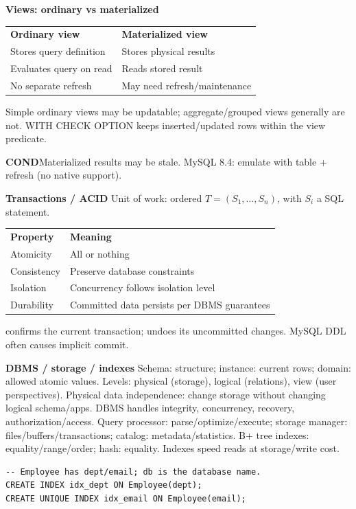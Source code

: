 \documentclass[a4paper]{article}
\newcommand{\sqlfont}{\ttfamily}
\newcommand{\bodyfontsize}{5.55}
\newcommand{\bodyleading}{5.3}
\newcommand{\bodylineskiplimit}{-2pt}
\newcommand{\bodystyle}{%
  \fontsize{\bodyfontsize}{\bodyleading}\selectfont\setlength{\lineskiplimit}{\bodylineskiplimit}\RaggedRight
  \setlength{\abovedisplayskip}{.5pt}\setlength{\belowdisplayskip}{.5pt}%
  \setlength{\abovedisplayshortskip}{.3pt}\setlength{\belowdisplayshortskip}{.3pt}}
\newenvironment{topicblock}
  {\par\bodystyle}
  {\par}
\newcommand{\key}[1]{\par\textcolor{structure}{\textbf{#1}}\enspace}
\newcommand{\note}[4]{\par\nointerlineskip\vspace{.25pt}\begingroup\setlength{\fboxsep}{0.1pt}%
  \noindent\colorbox{#1}{\parbox{\dimexpr\linewidth-2\fboxsep\relax}{%
    \RaggedRight\textcolor{#2}{\textbf{#3}}\enspace #4}}%
  \endgroup\par\nointerlineskip\vspace{.25pt}}
\newcommand{\cond}[1]{\note{conditionbg}{condition}{COND}{#1}}
\newcommand{\sql}[1]{{\sqlfont\color{sqltext}\detokenize{#1}}}
\newlength{\sheetwidth}
\newenvironment{sheetcolumns}[1]
  {\noindent\begin{minipage}[t]{#1\sheetwidth}\vspace{0pt}\bodystyle\ignorespaces}
  {\end{minipage}\par}
\begin{document}
\begin{sheetcolumns}{.254}
\begin{topicblock}
\key{Views: ordinary vs materialized}
\par\begingroup\setlength{\tabcolsep}{1.4pt}
\begin{tabular}{@{}ll@{}}
\textbf{Ordinary view} & \textbf{Materialized view}\\
Stores query definition & Stores physical results\\
Evaluates query on read & Reads stored result\\
No separate refresh & May need refresh/maintenance
\end{tabular}\endgroup\par
Simple ordinary views may be updatable; aggregate/grouped views generally are not. WITH CHECK OPTION keeps inserted/updated rows within the view predicate.
\cond{Materialized results may be stale. MySQL 8.4: emulate with table + refresh (no native support).}
\key{Transactions / ACID}
Unit of work: ordered $T=(S_1,\ldots,S_n)$, with $S_i$ a SQL statement.
\par\begingroup\setlength{\tabcolsep}{1.4pt}
\begin{tabular}{@{}ll@{}}
\textbf{Property} & \textbf{Meaning}\\
Atomicity & All or nothing\\
Consistency & Preserve database constraints\\
Isolation & Concurrency follows isolation level\\
Durability & Committed data persists per DBMS guarantees
\end{tabular}\endgroup\par
\sql{COMMIT} confirms the current transaction; \sql{ROLLBACK} undoes its uncommitted changes. MySQL DDL often causes implicit commit.
\key{DBMS / storage / indexes}
Schema: structure; instance: current rows; domain: allowed atomic values. Levels: physical (storage), logical (relations), view (user perspectives). Physical data independence: change storage without changing logical schema/apps. DBMS handles integrity, concurrency, recovery, authorization/access.
Query processor: parse/optimize/execute; storage manager: files/buffers/transactions; catalog: metadata/statistics. B+ tree indexes: equality/range/order; hash: equality. Indexes speed reads at storage/write cost.
\begin{lstlisting}
-- Employee has dept/email; db is the database name.
CREATE INDEX idx_dept ON Employee(dept);
CREATE UNIQUE INDEX idx_email ON Employee(email);

\end{lstlisting}
\end{topicblock}
\end{sheetcolumns}
\end{document}
